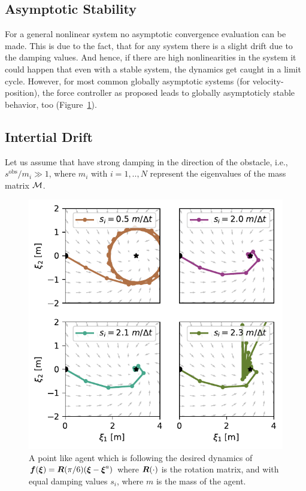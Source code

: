 \subsection{Asymptotic Stability}
For a general nonlinear system no asymptotic convergence evaluation can be made. This is due to the fact, that for any system there is a slight drift due to the damping values.
And hence, if there are high nonlinearities in the system it could happen that even with a stable system, the dynamics get caught in a limit cycle. However, for most common globally asymptotic systems (for velocity-position), the force controller as proposed leads to globally asymptoticly stable behavior, too (Figure~\ref{fig:discrete_controller_parameters_comparison_stable}).

\subsection{Intertial Drift}
Let us assume that have strong damping in the direction of the obstacle, i.e., $s^{\mathrm{obs}} / m_i \gg 1$, where $m_i$ with $i = 1, .., N$ represent the eigenvalues of the mass matrix $\mathcal{M}$. 


\begin{figure}[htb]
\centering
  \includegraphics[width=\columnwidth]{figures/discrete_controller_parameters_comparison_stable}
\caption{A point like agent which is following the desired dynamics of
$\boldsymbol{f}(\boldsymbol{\xi}) = \boldsymbol{R}(\pi / 6) (\boldsymbol{\xi}  - \boldsymbol{\xi}^a)$ where $\boldsymbol{R}(\cdot)$ is the rotation matrix, and with equal damping values $s_i$, where $m$ is the mass of the agent.}
  \label{fig:discrete_controller_parameters_comparison_stable}
\end{figure}

